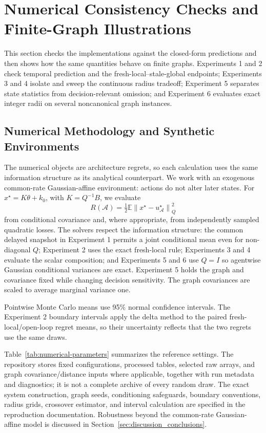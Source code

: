 \section{Numerical Consistency Checks and Finite-Graph Illustrations}
\label{sec:numerical-evaluation}

This section checks the implementations against the closed-form predictions
and then shows how the same quantities behave on finite graphs.  Experiments 1 and 2
check temporal prediction and the fresh-local--stale-global endpoints;
Experiments 3 and 4 isolate and sweep the continuous radius tradeoff;
Experiment 5 separates state statistics from decision-relevant omission; and
Experiment 6 evaluates exact integer radii on several noncanonical graph
instances.

\subsection{Numerical Methodology and Synthetic Environments}
\label{subsec:numerical-methodology}

The numerical objects are architecture regrets, so each calculation uses the
same information structure as its analytical counterpart.  We work with an
exogenous common-rate Gaussian-affine environment: actions do not alter later
states.  For
$x^\star=K\theta+k_0$, with $K=Q^{-1}B$, we evaluate
\begin{equation*}
    R(\mathcal A)=\tfrac12\mathbb E
    \left\|x^\star-u_{\mathcal A}^\star\right\|_Q^2
\end{equation*}
from conditional covariance and, where appropriate, from independently
sampled quadratic losses.  The solvers respect the information structure: the
common delayed snapshot in Experiment 1 permits a joint conditional mean even
for non-diagonal $Q$; Experiment 2 uses the exact fresh-local rule; Experiments
3 and 4 evaluate the scalar composition; and Experiments 5 and 6 use $Q=I$ so
agentwise Gaussian conditional variances are exact.  Experiment 5 holds the
graph and covariance fixed while changing decision sensitivity.  The graph
covariances are scaled to average marginal variance one.

Pointwise Monte Carlo means use 95\% normal confidence intervals.  The
Experiment 2 boundary intervals apply the delta method to the paired
fresh-local/open-loop regret means, so their uncertainty reflects that
the two regrets use the same draws.

Table~\ref{tab:numerical-parameters} summarizes the reference settings.  The
repository stores fixed configurations, processed tables, selected raw arrays,
and graph covariance/distance inputs where applicable, together with run
metadata and diagnostics; it is not a complete archive of every random draw.
The exact system construction, graph seeds, conditioning safeguards, boundary
conventions, radius grids, crossover estimator, and interval calculation are
specified in the reproduction documentation.  Robustness beyond the
common-rate Gaussian-affine model is discussed in
Section~\ref{sec:discussion_conclusions}.

